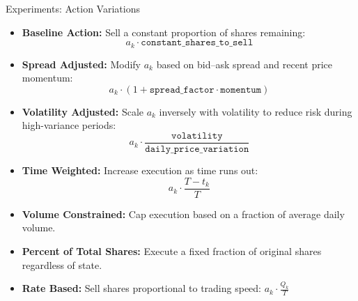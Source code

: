 \documentclass[11pt,aspectratio=169]{beamer}   %
\begin{document}
\begin{frame}{Experiments: Action Variations}
	\begin{itemize}
		\item \textbf{Baseline Action:}  
		Sell a constant proportion of shares remaining: 
		\[
		a_k \cdot \texttt{constant\_shares\_to\_sell}
		\]
		
		\item \textbf{Spread Adjusted:}  
		Modify $a_k$ based on bid–ask spread and recent price momentum:
		\[
		a_k \cdot (1 + \texttt{spread\_factor} \cdot \texttt{momentum})
		\]
		
		\item \textbf{Volatility Adjusted:}  
		Scale $a_k$ inversely with volatility to reduce risk during high-variance periods:
		\[
		a_k \cdot \frac{\texttt{volatility}}{\texttt{daily\_price\_variation}}
		\]
		
		\item \textbf{Time Weighted:}  
		Increase execution as time runs out:
		\[
		a_k \cdot \frac{T - t_k}{T}
		\]
		
		\item \textbf{Volume Constrained:}  
		Cap execution based on a fraction of average daily volume.
		
		\item \textbf{Percent of Total Shares:}  
		Execute a fixed fraction of original shares regardless of state.
		
		\item \textbf{Rate Based:}  
		Sell shares proportional to trading speed:
		$
		a_k \cdot \frac{Q_k}{T}
		$
	\end{itemize}
\end{frame}
\end{document}
